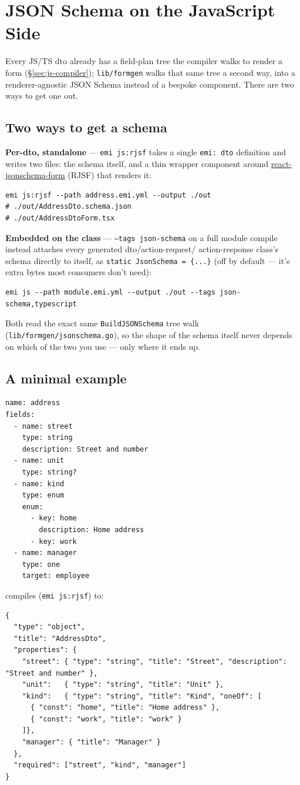 \section{JSON Schema on the JavaScript Side}
\label{sec:json-schema}

Every JS/TS dto already has a field-plan tree the compiler walks to render
a form (\S\ref{sec:js-compiler}); \texttt{lib/formgen} walks that same
tree a second way, into a renderer-agnostic JSON Schema instead of a
bespoke component. There are two ways to get one out.

\subsection{Two ways to get a schema}
\textbf{Per-dto, standalone} --- \texttt{emi js:rjsf} takes a single
\texttt{emi: dto} definition and writes two files: the schema itself, and
a thin wrapper component around \href{https://rjsf-team.github.io/react-jsonschema-form/}{react-jsonschema-form}
(RJSF) that renders it:
\begin{lstlisting}
emi js:rjsf --path address.emi.yml --output ./out
# ./out/AddressDto.schema.json
# ./out/AddressDtoForm.tsx
\end{lstlisting}

\textbf{Embedded on the class} --- \texttt{--tags json-schema} on a full
module compile instead attaches every generated dto/action-request/
action-response class's schema directly to itself, as
\texttt{static JsonSchema = \{...\}} (off by default --- it's extra
bytes most consumers don't need):
\begin{lstlisting}
emi js --path module.emi.yml --output ./out --tags json-schema,typescript
\end{lstlisting}
Both read the exact same \texttt{BuildJSONSchema} tree walk
(\texttt{lib/formgen/jsonschema.go}), so the shape of the schema itself
never depends on which of the two you use --- only where it ends up.

\subsection{A minimal example}
\begin{lstlisting}
name: address
fields:
  - name: street
    type: string
    description: Street and number
  - name: unit
    type: string?
  - name: kind
    type: enum
    enum:
      - key: home
        description: Home address
      - key: work
  - name: manager
    type: one
    target: employee
\end{lstlisting}
compiles (\texttt{emi js:rjsf}) to:
\begin{lstlisting}
{
  "type": "object",
  "title": "AddressDto",
  "properties": {
    "street": { "type": "string", "title": "Street", "description": "Street and number" },
    "unit":   { "type": "string", "title": "Unit" },
    "kind":   { "type": "string", "title": "Kind", "oneOf": [
      { "const": "home", "title": "Home address" },
      { "const": "work", "title": "work" }
    ]},
    "manager": { "title": "Manager" }
  },
  "required": ["street", "kind", "manager"]
}
\end{lstlisting}

